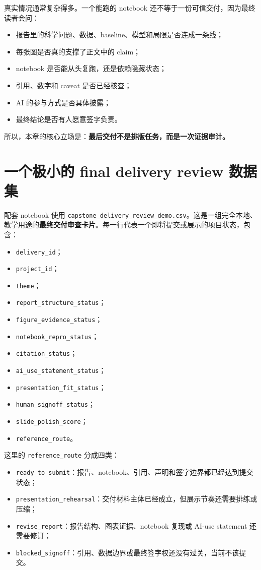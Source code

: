 真实情况通常复杂得多。一个能跑的 notebook 还不等于一份可信交付，因为最终读者会问：

\begin{itemize}
    \item 报告里的科学问题、数据、baseline、模型和局限是否连成一条线；
    \item 每张图是否真的支撑了正文中的 claim；
    \item notebook 是否能从头复跑，还是依赖隐藏状态；
    \item 引用、数字和 caveat 是否已经核查；
    \item AI 的参与方式是否具体披露；
    \item 最终结论是否有人愿意签字负责。
\end{itemize}

所以，本章的核心立场是：\textbf{最后交付不是排版任务，而是一次证据审计。}

\section{一个极小的 final delivery review 数据集}

配套 notebook 使用 \nolinkurl{capstone_delivery_review_demo.csv}。这是一组完全本地、教学用途的\textbf{最终交付审查卡片}。每一行代表一个即将提交或展示的项目状态，包含：

\begin{itemize}
    \item \texttt{delivery\_id}；
    \item \texttt{project\_id}；
    \item \texttt{theme}；
    \item \texttt{report\_structure\_status}；
    \item \texttt{figure\_evidence\_status}；
    \item \texttt{notebook\_repro\_status}；
    \item \texttt{citation\_status}；
    \item \texttt{ai\_use\_statement\_status}；
    \item \texttt{presentation\_fit\_status}；
    \item \texttt{human\_signoff\_status}；
    \item \texttt{slide\_polish\_score}；
    \item \texttt{reference\_route}。
\end{itemize}

这里的 \texttt{reference\_route} 分成四类：

\begin{itemize}
    \item \texttt{ready\_to\_submit}：报告、notebook、引用、声明和签字边界都已经达到提交状态；
    \item \texttt{presentation\_rehearsal}：交付材料主体已经成立，但展示节奏还需要排练或压缩；
    \item \texttt{revise\_report}：报告结构、图表证据、notebook 复现或 AI-use statement 还需要修订；
    \item \texttt{blocked\_signoff}：引用、数据边界或最终签字权还没有过关，当前不该提交。
\end{itemize}

